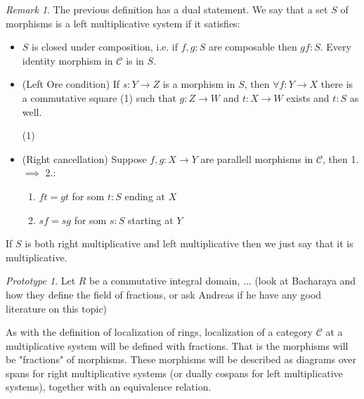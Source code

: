 \documentclass[11pt]{article}
\theoremstyle{definition}
\theoremstyle{remark}
\newtheorem*{remark}{Remark}
\newtheorem*{prototype}{Prototype}
\begin{document}
            \begin{remark}
                The previous definition has a dual statement. We say that a set $S$ of morphisms is a left multiplicative system if it satisfies:
                \begin{itemize}
                    \item $S$ is closed under composition, i.e. if $f,g : S$ are composable then $gf : S$. Every identity morphism in $\mathcal{C}$ is in $S$.
                    \item (Left Ore condition) If $s : Y \rightarrow Z$ is a morphism in $S$, then $\forall f:Y\rightarrow X$ there is a commutative square (1) such that $g:Z\rightarrow W$ and $t:X\rightarrow W$ exists and $t:S$ as well.
                    \begin{center}
                        (1)
                    \end{center}
                    \item (Right cancellation) Suppose $f,g:X\rightarrow Y$ are parallell morphisms in $\mathcal{C}$, then 1. $\implies$ 2.:
                    \begin{enumerate}
                        \item $ft = gt$ for som $t:S$ ending at $X$
                        \item $sf = sg$ for som $s:S$ starting at $Y$
                    \end{enumerate}
                \end{itemize}
                If $S$ is both right multiplicative and left multiplicative then we just say that it is multiplicative.
            \end{remark}

            \begin{prototype}
                Let $R$ be a commutative integral domain, ... (look at Bacharaya and how they define the field of fractions, or ask Andreas if he have any good literature on this topic)
            \end{prototype}

            As with the definition of localization of rings, localization of a category $\mathcal{C}$ at a multiplicative system will be defined with fractions. That is the morphisms will be "fractions" of morphisms. These morphisms will be described as diagrams over spans for right multiplicative systems (or dually cospans for left multiplicative systems), together with an equivalence relation.
\end{document}
